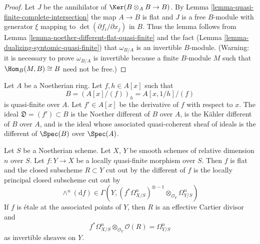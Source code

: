 \begin{proof}
Let $J$ be the annihilator of $\Ker(B \otimes_A B \to B)$.
By Lemma \ref{lemma-quasi-finite-complete-intersection}
the map $A \to B$ is flat and
$J$ is a free $B$-module with generator $\xi$ mapping to
$\det(\partial f_i/\partial x_j)$ in $B$.
Thus the lemma follows from
Lemma \ref{lemma-noether-different-flat-quasi-finite}
and the fact (Lemma \ref{lemma-dualizing-syntomic-quasi-finite})
that $\omega_{B/A}$ is an invertible $B$-module.
(Warning: it is necessary to prove $\omega_{B/A}$
is invertible because a finite $B$-module $M$ such
that $\Hom_B(M, B) \cong B$ need not be free.)
\end{proof}

\begin{example}
\label{example-different-for-monogenic}
Let $A$ be a Noetherian ring. Let $f, h \in A[x]$ such that
$$
B = (A[x]/(f))_h = A[x, 1/h]/(f)
$$
is quasi-finite over $A$. Let $f' \in A[x]$ be the derivative
of $f$ with respect to $x$. The ideal $\mathfrak{D} = (f') \subset B$
is the Noether different of $B$ over $A$,
is the K\"ahler different of $B$ over $A$, and
is the ideal whose associated quasi-coherent sheaf of ideals is the
different of $\Spec(B)$ over $\Spec(A)$.
\end{example}

\begin{lemma}
\label{lemma-discriminant-quasi-finite-morphism-smooth}
Let $S$ be a Noetherian scheme. Let $X$, $Y$ be smooth schemes
of relative dimension $n$ over $S$. Let $f : Y \to X$ be a
locally quasi-finite morphism over $S$.
Then $f$ is flat and the closed subscheme $R \subset Y$
cut out by the different of $f$ is the locally principal
closed subscheme cut out by
$$
\wedge^n(\text{d}f) \in
\Gamma(Y,
(f^*\Omega^n_{X/S})^{\otimes -1} \otimes_{\mathcal{O}_Y} \Omega^n_{Y/S})
$$
If $f$ is \'etale at the associated points of $Y$, then $R$ is an
effective Cartier divisor and
$$
f^*\Omega^n_{X/S} \otimes_{\mathcal{O}_Y} \mathcal{O}(R) =
\Omega^n_{Y/S}
$$
as invertible sheaves on $Y$.
\end{lemma}

